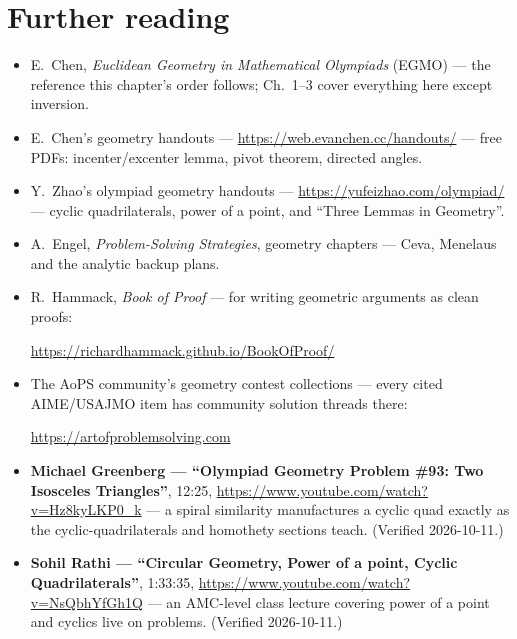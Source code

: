 \section*{Further reading}
\begin{itemize}
\item E.~Chen, \emph{Euclidean Geometry in Mathematical Olympiads}
(EGMO) --- the reference this chapter's order follows; Ch.~1--3 cover
everything here except inversion.
\item E.~Chen's geometry handouts ---
\url{https://web.evanchen.cc/handouts/}
--- free PDFs: incenter/excenter
lemma, pivot theorem, directed angles.
\item Y.~Zhao's olympiad geometry handouts ---
\url{https://yufeizhao.com/olympiad/}
--- cyclic quadrilaterals, power
of a point, and ``Three Lemmas in Geometry''.
\item A.~Engel, \emph{Problem-Solving Strategies}, geometry chapters
--- Ceva, Menelaus and the analytic backup plans.
\item R.~Hammack, \emph{Book of Proof} --- for writing
geometric arguments as clean proofs:

\url{https://richardhammack.github.io/BookOfProof/}
\item The AoPS community's geometry contest collections ---
every cited AIME/USAJMO item has community solution threads there:

\url{https://artofproblemsolving.com}
\end{itemize}

\begin{rulebox}
\begin{itemize}
\item \textbf{Michael Greenberg --- ``Olympiad Geometry Problem \#93:
Two Isosceles Triangles''}, 12:25,
\url{https://www.youtube.com/watch?v=Hz8kyLKP0_k}
--- a spiral
similarity manufactures a cyclic quad exactly as the
cyclic-quadrilaterals and homothety sections teach.
(Verified 2026-10-11.)
\item \textbf{Sohil Rathi --- ``Circular Geometry, Power of a point,
Cyclic Quadrilaterals''}, 1:33:35,
\url{https://www.youtube.com/watch?v=NsQbhYfGh1Q}
--- an AMC-level class
lecture covering power of a point and cyclics live on problems.
(Verified 2026-10-11.)
\end{itemize}
\end{rulebox}

\chapternotes
